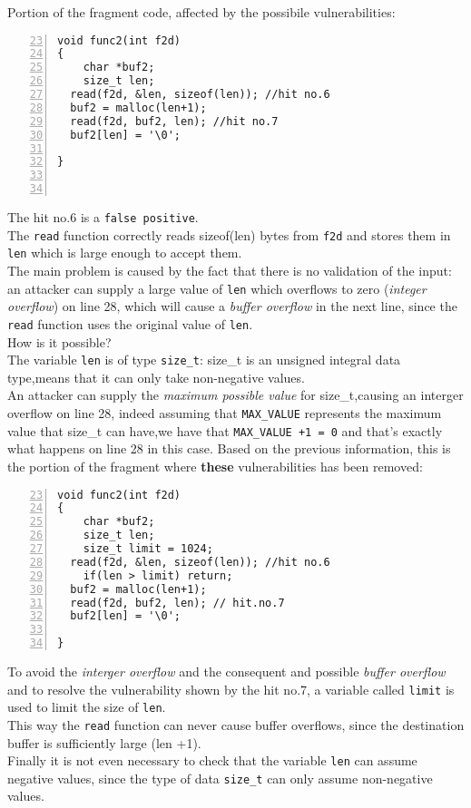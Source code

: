 \documentclass[a4paper,12pt]{article}
\begin{document}
\noindent
Portion of the fragment code, affected by the possibile vulnerabilities:
\begin{lstlisting}[style=c,numbers=left,firstnumber=23,linebackgroundcolor={
\ifnum\value{lstnumber}=27\color{green}\fi
\ifnum\value{lstnumber}=28\color{red}\fi
\ifnum\value{lstnumber}=29\color{red}\fi}]
void func2(int f2d)
{
	char *buf2;
	size_t len;
  read(f2d, &len, sizeof(len)); //hit no.6
  buf2 = malloc(len+1); 
  read(f2d, buf2, len); //hit no.7
  buf2[len] = '\0';

}



\end{lstlisting}
The hit no.6 is a \texttt{false positive}.\\
The \texttt{read} function correctly reads sizeof(len) bytes from \texttt{f2d} and stores them in \texttt{len} which is large enough to accept them.\\
The main problem is caused by the fact that there is no validation of the input: an attacker can supply a large value of \texttt{len} which 
overflows to zero (\textit{integer overflow}) on line 28, which will cause a \textit{buffer overflow} in the next line, since the \texttt{read} function uses the original value of \texttt{len}.\\
How is it possible?\\
The variable \texttt{len} is of type \texttt{size\_t}: size\_t is an unsigned integral data type,means that it can only take non-negative values.\\
An attacker can supply the \emph{maximum possible value} for size\_t,causing an interger overflow on line 28, indeed assuming that \texttt{MAX\_VALUE} represents the maximum value that size\_t can have,we have that \texttt{MAX\_VALUE +1 = 0} and that's exactly what happens on line 28 in this case.
\newpage
\noindent
Based on the previous information, this is the portion of the fragment where \textbf{these} vulnerabilities has been removed:
\begin{lstlisting}[style=c,numbers=left,firstnumber=23,linebackgroundcolor={
\ifnum\value{lstnumber}=27\color{green}\fi
\ifnum\value{lstnumber}=28\color{green}\fi
\ifnum\value{lstnumber}=29\color{green}\fi
\ifnum\value{lstnumber}=31\color{green}\fi}]
void func2(int f2d)
{
	char *buf2;
	size_t len;
	size_t limit = 1024;
  read(f2d, &len, sizeof(len)); //hit no.6
	if(len > limit) return;   
  buf2 = malloc(len+1); 
  read(f2d, buf2, len); // hit.no.7
  buf2[len] = '\0';

}
\end{lstlisting}
To avoid the \textit{interger overflow} and the consequent and possible \textit{buffer overflow} and to resolve the vulnerability shown by the hit no.7, a variable called \texttt{limit} is used to limit the size of \texttt{len}.\\
This way the \texttt{read} function can never cause buffer overflows, since the destination buffer is sufficiently large (len +1).\\
Finally it is not even necessary to check that the variable \texttt{len} can assume negative values, since the type of data \texttt{size\_t} can only assume non-negative values.
\newpage
\end{document}
